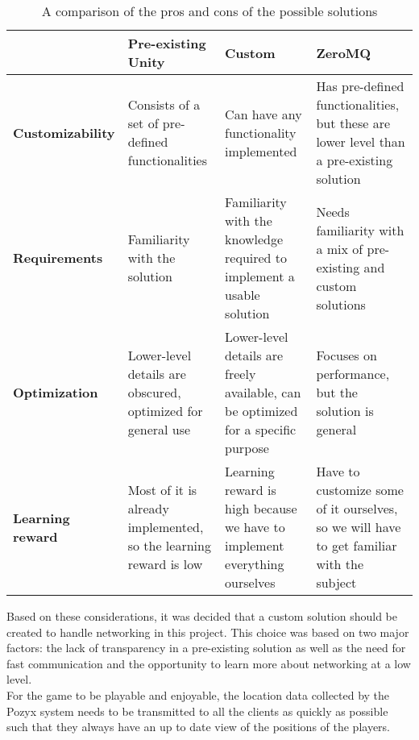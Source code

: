 \begin{table}[H]
    \begin{tabularx}{\textwidth}{|X|X|X|X|}
    \hline
        
            & \textbf{Pre-existing Unity}    
            & \textbf{Custom}
            & \textbf{ZeroMQ}  
            \\ \hline
        \textbf{Customizability} 
            & Consists of a set of pre-defined functionalities            
            & Can have any functionality implemented                                            
            & Has pre-defined functionalities, but these are lower level than a pre-existing solution 
            \\ \hline
        \textbf{Requirements}    
            & Familiarity with the solution                               
            & Familiarity with the knowledge required to implement a usable solution            
            & Needs familiarity with a mix of pre-existing and custom solutions                     
            \\ \hline
        \textbf{Optimization}    
            & Lower-level details are obscured, optimized for general use 
            & Lower-level details are freely available, can be optimized for a specific purpose 
            & Focuses on performance, but the solution is general                                     
            \\ \hline
        \textbf{Learning reward}
            & Most of it is already implemented, so the learning reward is low
            & Learning reward is high because we have to implement everything ourselves
            & Have to customize some of it ourselves, so we will have to get familiar with the subject
            \\ \hline
        \end{tabularx}
    \caption{A comparison of the pros and cons of the possible solutions}
    \label{tab:networkprosandcons}
\end{table}
Based on these considerations, it was decided that a custom solution should be created to handle networking in this project.
This choice was based on two major factors: the lack of transparency in a pre-existing solution as well as the need for fast communication and the opportunity to learn more about networking at a low level. \\
For the game to be playable and enjoyable, the location data collected by the Pozyx system needs to be transmitted to all the clients as quickly as possible such that they always have an up to date view of the positions of the players.\\
